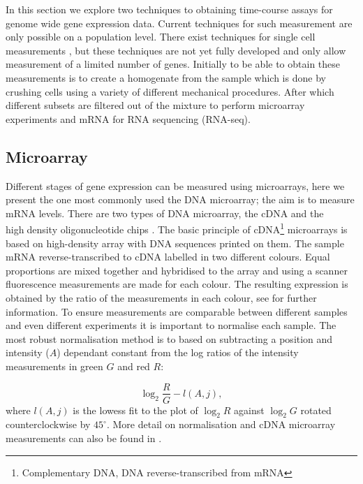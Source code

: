 In this section we explore two techniques to obtaining time-course assays for genome wide gene expression data. Current techniques for such measurement are only possible on a population level. There exist techniques for single cell measurements \citep{Buganim:2012hp}, but these techniques are not yet fully developed and only allow measurement of a limited number of genes. Initially to be able to obtain these measurements is to create a homogenate from the sample which is done by crushing cells using a variety of different mechanical procedures. After which different subsets are filtered out of the mixture to perform microarray experiments and mRNA for RNA sequencing (RNA-seq). 

\subsection{Microarray}
\label{sec:microarray}

Different stages of gene expression can be measured using microarrays, here we present the one most commonly used the DNA microarray; the aim is to measure mRNA levels. There are two types of DNA microarray, the cDNA \citep{Hughes:2001ho} and the high􏰄density oligonucleotide chips \citep{Lockhart:1996jw}. The basic principle of cDNA\footnote{Complementary DNA, DNA reverse-transcribed from mRNA} microarrays is based on high-density array with DNA sequences printed on them. The sample mRNA reverse-transcribed to cDNA labelled in two different colours. Equal proportions are mixed together and hybridised to the array and using a scanner fluorescence measurements are made for each colour. The resulting expression is obtained by the ratio of the measurements in each colour, see \cite{phimister1999chipping} for further information. To ensure measurements are comparable between different samples and even different experiments it is important to normalise each sample. The most robust normalisation method is to based on subtracting a position and intensity ($A$) dependant constant from the log ratios of the intensity measurements in green $G$ and red $R$:

\begin{equation}
  \label{eq:microarray-norm}
  \log_2 \frac{R}{G} - l(A, j), 
\end{equation}
where $l(A, j)$ is the lowess fit \citep{Cleveland:2012fu} to the plot of $\log_2 R$ against $\log_2 G$ rotated counterclockwise by $45^{\circ}$. More detail on normalisation and cDNA microarray measurements can also be found in \cite{Dudoit:2002va}. 

